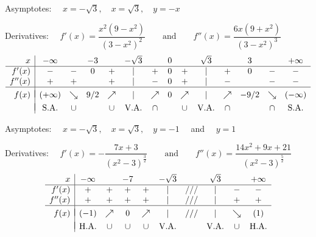 \begin{Answer}
    	\ifcalculus 
    	\Question Asymptotes: $\quad x=-\sqrt{3},\quad x=\sqrt{3},\quad y=-x$\par
    		Derivatives: $\quad f'(x)=\dfrac{x^2(9-x^2)}{(3-x^2)^2}\qquad\mbox{and}\qquad f''(x)=\dfrac{6x(9+x^2)}{(3-x^2)^3}$
    		\[ \begin{array}{r|ccccccccccccc}
    		x & -\infty  &  & -3 &  & -\sqrt{3}  & &  0 & &  \sqrt{3} & & 3 & & +\infty \\
    		\hline
    		f'(x)   & - & - & 0 & + & | & + & 0 & + & | & + & 0 & - & -  \\
    		f''(x)  & + & + &  & + & | & - & 0 & + & | & -  &  & - & -  \\
    		\hline
    		&&&&&&&&&&&&&\vspace{-0.3cm}\\
    		f(x)  &  (+\infty) & \searrow & 9/2 & \nearrow & | & \nearrow & 0 & \nearrow   & | & \nearrow & -9/2 & \searrow &  (-\infty) \\
    		&&&&&&&&&&&&&
    		\vspace{-0.3cm}\\                             
    		& \mbox{S.A.} & \cup   &   & \cup & \mbox{V.A.} & \cap & &\cup & \mbox{V.A.} & \cap & & \cap & \mbox{S.A.} \\
    		\end{array}\]
    	\fi	
    	
    	\Question Asymptotes: $\quad x=-\sqrt{3},\quad x=\sqrt{3},\quad y=-1\quad$ and $\quad y=1$\par
    		Derivatives: $\quad f'(x)=-\dfrac{7x+3}{(x^2-3)^{\frac{3}{2}}}\qquad\mbox{and}\qquad f''(x)=\dfrac{14x^2+9x+21}{(x^2-3)^{\frac{5}{2}}}$
    		\[ \begin{array}{r|ccccccccc}
    		x & -\infty  &  & -7 &  & -\sqrt{3} & & \sqrt{3} & &+\infty \\
    		\hline
    		f'(x)   & + & + & + & + & | & /// & | & - & -\\
    		f''(x)  & + & + & + & + & | & /// & | & + & +\\
    		\hline
    		&&&&&&&&&\vspace{-0.3cm}\\
    		f(x)    & (-1) & \nearrow & 0 & \nearrow & | & /// & | & \searrow & (1)\\
    		&&&&&&&&&\vspace{-0.3cm}\\                                                                              
    		& \mbox{H.A.} & \cup   & \cup & \cup & \mbox{V.A.} &  & \mbox{V.A.} & \cup & \mbox{H.A.} \\
    		\end{array}\]
    		

\end{Answer}
